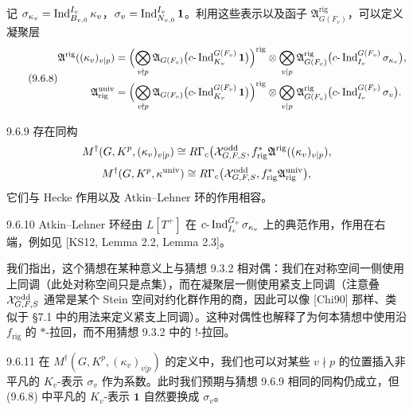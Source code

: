 记 $\sigma_{\kappa_v}=\operatorname{Ind}_{B_{v,0}}^{I_v}\kappa_v$，$\sigma_v=\operatorname{Ind}_{N_{v,0}}^{I_v}\mathbf 1$。利用这些表示以及函子 $\mathfrak A^{\mathrm{rig}}_{G(F_v)}$，可以定义凝聚层
\begin{equation}\tag{9.6.8}\label{eq:a4-16-9-6-8}
\begin{aligned}
\mathfrak A^{\mathrm{rig}}((\kappa_v)_{v|p})&=\Bigl(\bigotimes_{v\nmid p}\mathfrak A_{G(F_v)}\bigl(c\text{-}\operatorname{Ind}_{K_v}^{G(F_v)}\mathbf 1\bigr)\Bigr)^{\mathrm{rig}}\otimes\bigotimes_{v|p}\mathfrak A^{\mathrm{rig}}_{G(F_v)}\bigl(c\text{-}\operatorname{Ind}_{I_v}^{G(F_v)}\sigma_{\kappa_v}\bigr),\\
\mathfrak A^{\mathrm{univ}}_{\mathrm{rig}}&=\Bigl(\bigotimes_{v\nmid p}\mathfrak A_{G(F_v)}\bigl(c\text{-}\operatorname{Ind}_{K_v}^{G(F_v)}\mathbf 1\bigr)\Bigr)^{\mathrm{rig}}\otimes\bigotimes_{v|p}\mathfrak A^{\mathrm{rig}}_{G(F_v)}\bigl(c\text{-}\operatorname{Ind}_{I_v}^{G(F_v)}\sigma_v\bigr).
\end{aligned}
\end{equation}

\begin{conj}{9.6.9}\label{conj:a4-16-9-6-9}
存在同构
\[
M^\dagger(G,K^p,(\kappa_v)_{v|p})\cong R\Gamma_c\bigl(\mathcal{X}^{\mathrm{odd}}_{G,F,S},f_{\mathrm{rig}}^*\mathfrak A^{\mathrm{rig}}((\kappa_v)_{v|p}),
\]
\[
M^\dagger(G,K^p,\kappa^{\mathrm{univ}})\cong R\Gamma_c\bigl(\mathcal{X}^{\mathrm{odd}}_{G,F,S},f_{\mathrm{rig}}^*\mathfrak A^{\mathrm{univ}}_{\mathrm{rig}}\bigr),
\]
它们与 Hecke 作用以及 Atkin--Lehner 环的作用相容。
\end{conj}

\begin{rem}{9.6.10}\label{rem:a4-16-9-6-10}
Atkin--Lehner 环经由 $L[T^+]$ 在 $c\text{-}\operatorname{Ind}_{I_v}^{G_v}\sigma_{\kappa_v}$ 上的典范作用，作用在右端，例如见 [KS12, Lemma 2.2, Lemma 2.3]。

我们指出，这个猜想在某种意义上与猜想 9.3.2 相对偶：我们在对称空间一侧使用上同调（此处对称空间只是点集），而在凝聚层一侧使用紧支上同调（注意叠 $\mathcal{X}^{\mathrm{odd}}_{G,F,S}$ 通常是某个 Stein 空间对约化群作用的商，因此可以像 [Chi90] 那样、类似于 §7.1 中的用法来定义紧支上同调）。这种对偶性也解释了为何本猜想中使用沿 $f_{\mathrm{rig}}$ 的 $*$-拉回，而不用猜想 9.3.2 中的 $!$-拉回。
\end{rem}

\begin{rem}{9.6.11}\label{rem:a4-16-9-6-11}
在 $M^\dagger(G,K^p,(\kappa_v)_{v|p})$ 的定义中，我们也可以对某些 $v\nmid p$ 的位置插入非平凡的 $K_v$-表示 $\sigma_v$ 作为系数。此时我们预期与猜想 9.6.9 相同的同构仍成立，但 (9.6.8) 中平凡的 $K_v$-表示 $\mathbf 1$ 自然要换成 $\sigma_v$。
\end{rem}

